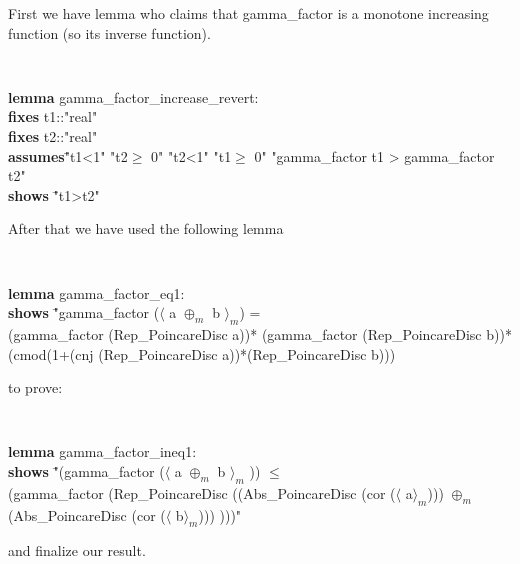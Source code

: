 \documentclass[a4paper]{article}
\newcommand{\tab}{\hspace{5mm}}
\theoremstyle{definition}
\begin{document}
First we have lemma who claims that gamma\_factor is a monotone increasing function (so its inverse function).

{\tt
\begin{footnotesize}
\begin{tabbing}
{\bf lemma} gamma\_factor\_increase\_revert:\\
{\bf fixes} t1::"real"\\
{\bf fixes} t2::"real"\\
{\bf assumes}\="t1<1" "t2$\geq$ 0" "t2<1" "t1$\geq$ 0" "gamma\_factor t1 > gamma\_factor t2"\\
{\bf shows} \="t1>t2"\\[1mm]

\end{tabbing}
\end{footnotesize}
}

After that we have used the following lemma 

{\tt
\begin{footnotesize}
\begin{tabbing}
{\bf lemma} gamma\_factor\_eq1:\\
{\bf shows} \="gamma\_factor ($\langle$  a  $\oplus_m$ b $\rangle_m$) =\\
\tab (gamma\_factor (Rep\_PoincareDisc a))* (gamma\_factor (Rep\_PoincareDisc b))*\\ \tab(cmod(1+(cnj (Rep\_PoincareDisc a))*(Rep\_PoincareDisc b)))\\
\end{tabbing}
\end{footnotesize}
}

to prove:

{\tt
\begin{footnotesize}
\begin{tabbing}
{\bf lemma} gamma\_factor\_ineq1:\\
{\bf shows} \="(gamma\_factor ($\langle$  a  $\oplus_m$ b $\rangle_m$ )) $\leq$\\
\tab (gamma\_factor (Rep\_PoincareDisc ((Abs\_PoincareDisc (cor ($\langle$ a$\rangle_m$)))  $\oplus_m$ \\
\tab(Abs\_PoincareDisc (cor ($\langle$ b$\rangle_m$))) )))"\\[1mm]

\end{tabbing}
\end{footnotesize}
}

and finalize our result.
\end{document}
